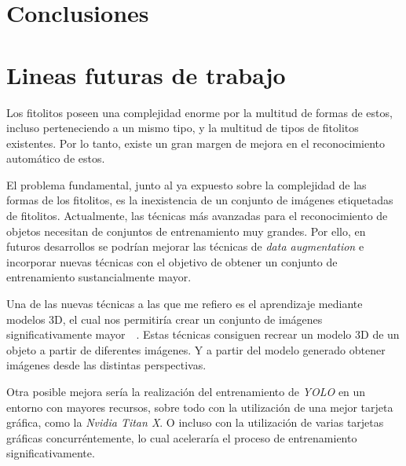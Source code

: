 

\section{Conclusiones}

\section{Lineas futuras de trabajo}

Los fitolitos poseen una complejidad enorme por la multitud de formas de estos, incluso perteneciendo a un mismo tipo, y la multitud de tipos de fitolitos existentes. Por lo tanto, existe un gran margen de mejora en el reconocimiento automático de estos.

El problema fundamental, junto al ya expuesto sobre la complejidad de las formas de los fitolitos, es la inexistencia de un conjunto de imágenes etiquetadas de fitolitos. Actualmente, las técnicas más avanzadas para el reconocimiento de objetos necesitan de conjuntos de entrenamiento muy grandes. Por ello, en futuros desarrollos se podrían mejorar las técnicas de \textit{data augmentation} e incorporar nuevas técnicas con el objetivo de obtener un conjunto de entrenamiento sustancialmente mayor.

Una de las nuevas técnicas a las que me refiero es el aprendizaje mediante modelos 3D, el cual nos permitiría crear un conjunto de imágenes significativamente mayor~\cite{sem}~\cite{3dmodels}. Estas técnicas consiguen recrear un modelo 3D de un objeto a partir de diferentes imágenes. Y a partir del modelo generado obtener imágenes desde las distintas perspectivas.

Otra posible mejora sería la realización del entrenamiento de \textit{YOLO} en un entorno con mayores recursos, sobre todo con la utilización de una mejor tarjeta gráfica, como la \textit{Nvidia Titan X}. O incluso con la utilización de varias tarjetas gráficas concurréntemente, lo cual aceleraría el proceso de entrenamiento significativamente.